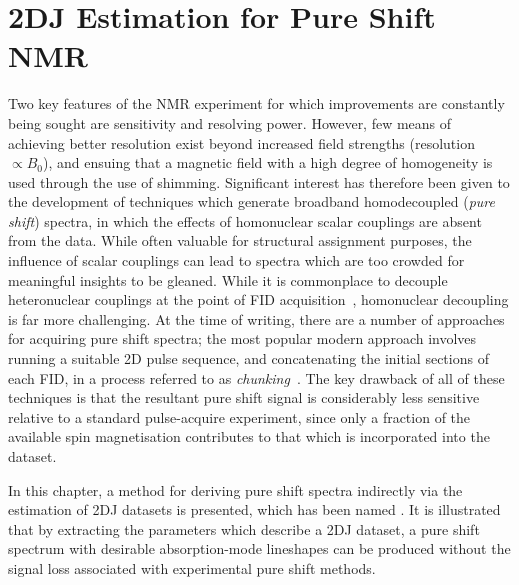 \chapter{2DJ Estimation for Pure Shift NMR}
\label{chap:cupid}
Two key features of the \ac{NMR} experiment for which improvements are
constantly being sought are sensitivity and resolving power.
However, few means of achieving better resolution exist beyond increased field
strengths (resolution $\propto B_0$), and ensuing that a magnetic
field with a high degree of homogeneity is used through the use of shimming.
Significant interest has therefore
been given to the development of techniques which generate broadband homodecoupled
(\emph{pure shift}) spectra, in which the effects of homonuclear scalar
couplings are absent from the data. While often valuable for structural
assignment purposes, the influence of scalar couplings can lead to spectra
which are too crowded for meaningful insights to be gleaned. While it is
commonplace to decouple heteronuclear couplings at the point of \ac{FID}
acquisition~\cite{Shaka1983a, Shaka1983b,Shaka1985}, homonuclear decoupling is
far more challenging. At the time of writing, there are a number of approaches
for acquiring pure shift spectra; the most popular modern approach
involves running a suitable \ac{2D} pulse sequence, and concatenating the initial
sections of each \ac{FID}, in a process referred to as
\emph{chunking}~\cite{Meyer2013,Adams2014,Zangger2015}. The key drawback of all of
these techniques is that the resultant pure shift signal is considerably less
sensitive relative to a standard pulse-acquire experiment, since only a
fraction of the available spin magnetisation contributes to that which is
incorporated into the dataset.

In this chapter, a method for deriving pure shift spectra indirectly via the
estimation of \ac{2DJ} datasets is presented, which has been named
. It is illustrated that by extracting the parameters which
describe a \ac{2DJ} dataset, a pure shift spectrum with desirable
absorption-mode lineshapes can be produced without the signal loss associated
with experimental pure shift methods.





